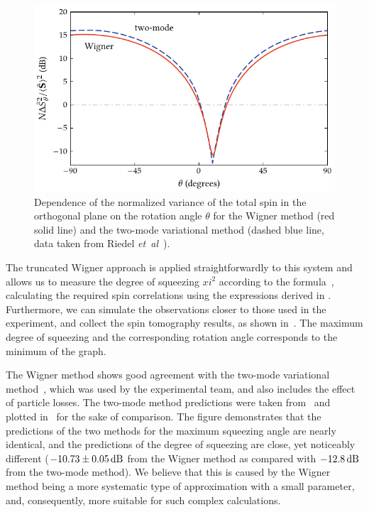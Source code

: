 \begin{figure}
    \centerline{\includegraphics{figures_generated/bec_squeezing/riedel_rotation.pdf}}

    \caption[Wigner simulated spin tomography in the component separation experiment]{
    Dependence of the normalized variance of the total spin in the orthogonal plane on the rotation angle $\theta$ for the Wigner method (red solid line) and the two-mode variational method (dashed blue line, data taken from Riedel \textit{et~al}~\cite{Riedel2010}).
    }%
    \label{fig:bec-squeezing:separation:tomography}
\end{figure}

The truncated Wigner approach is applied straightforwardly to this system and allows us to measure the degree of squeezing $xi^2$ according to the formula~, calculating the required spin correlations using the expressions derived in .
Furthermore, we can simulate the observations closer to those used in the experiment, and collect the spin tomography results, as shown in~.
The maximum degree of squeezing and the corresponding rotation angle corresponds to the minimum of the graph.

The Wigner method shows good agreement with the two-mode variational method~\cite{Li2009}, which was used by the experimental team, and also includes the effect of particle losses.
The two-mode method predictions were taken from~\cite{Riedel2010} and plotted in~ for the sake of comparison.
The figure demonstrates that the predictions of the two methods for the maximum squeezing angle are nearly identical, and the predictions of the degree of squeezing are close, yet noticeably different ($-10.73\pm0.05\mbox{\ensuremath{\,\mathrm{dB}}}$ from the Wigner method as compared with $-12.8\mbox{\ensuremath{\,\mathrm{dB}}}$ from the two-mode method).
We believe that this is caused by the Wigner method being a more systematic type of approximation with a small parameter, and, consequently, more suitable for such complex calculations.

